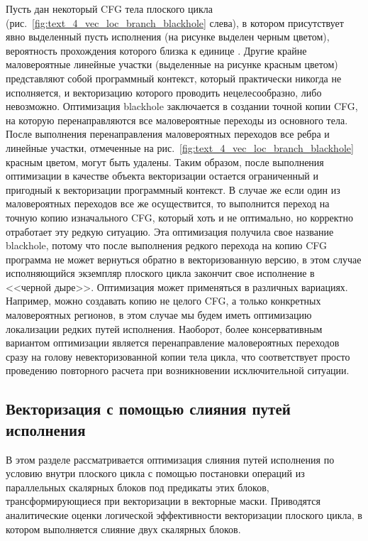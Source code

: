 Пусть дан некоторый CFG\label{abbr:cfg-2} тела плоского цикла (рис.~\ref{fig:text_4_vec_loc_branch_blackhole} слева), в котором присутствует явно выделенный пусть исполнения (на рисунке выделен черным цветом), вероятность прохождения которого близка к единице \cite{Shabanov2021VecCFG}.
Другие крайне маловероятные линейные участки (выделенные на рисунке красным цветом) представляют собой программный контекст, который практически никогда не исполняется, и векторизацию которого проводить нецелесообразно, либо невозможно.
Оптимизация blackhole заключается в создании точной копии CFG, на которую перенаправляются все маловероятные переходы из основного тела.
После выполнения перенаправления маловероятных переходов все ребра и линейные участки, отмеченные на рис.~\ref{fig:text_4_vec_loc_branch_blackhole} красным цветом, могут быть удалены.
Таким образом, после выполнения оптимизации в качестве объекта векторизации остается ограниченный и пригодный к векторизации программный контекст.
В случае же если один из маловероятных переходов все же осуществится, то выполнится переход на точную копию изначального CFG, который хоть и не оптимально, но корректно отработает эту редкую ситуацию.
Эта оптимизация получила свое название blackhole, потому что после выполнения редкого перехода на копию CFG программа не может вернуться обратно в векторизованную версию, в этом случае исполняющийся экземпляр плоского цикла закончит свое исполнение в <<черной дыре>>.
Оптимизация может применяться в различных вариациях.
Например, можно создавать копию не целого CFG, а только конкретных маловероятных регионов, в этом случае мы будем иметь оптимизацию локализации редких путей исполнения.
Наоборот, более консервативным вариантом оптимизации является перенаправление маловероятных переходов сразу на голову невекторизованной копии тела цикла, что соответствует просто проведению повторного расчета при возникновении исключительной ситуации.


\subsection{Векторизация с помощью слияния путей исполнения}\label{sec:vec_mrg}

В этом разделе рассматривается оптимизация слияния путей исполнения по условию внутри плоского цикла с помощью постановки операций из параллельных скалярных блоков под предикаты этих блоков, трансформирующиеся при векторизации в векторные маски.
Приводятся аналитические оценки логической эффективности векторизации плоского цикла, в котором выполняется слияние двух скалярных блоков.

